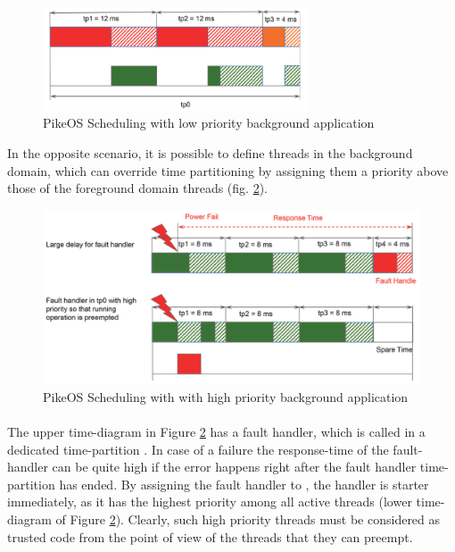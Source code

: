 \begin{figure}[htbp] 
\centering    
\includegraphics[width=0.7\textwidth]{PikeosLowTP0}
\caption{PikeOS Scheduling with low priority background application}
\label{fig:PikeosLowTP0}
\end{figure}

In the opposite scenario, it is possible to define threads in the background domain, which can override time partitioning by assigning them a priority above those of the foreground domain threads (fig. \ref{fig:PikeosHighTP0}). 

\begin{figure}[htbp] 
\centering    
\includegraphics[width=1.0\textwidth]{PikeosHighTP0}
\caption{PikeOS Scheduling with with high priority background application}
\label{fig:PikeosHighTP0}
\end{figure}

\paragraph{}The upper time-diagram in Figure \ref{fig:PikeosHighTP0} has a fault handler, which is called in a dedicated time-partition . In case of a failure the response-time of the fault-handler can be quite high if the error happens right after the fault handler time-partition has ended. By assigning the fault handler to , the handler is starter immediately, as it has the highest priority among all active threads (lower time-diagram of Figure \ref{fig:PikeosHighTP0}). Clearly, such high priority threads must be considered as trusted code from the point of view of the threads that they can preempt.

